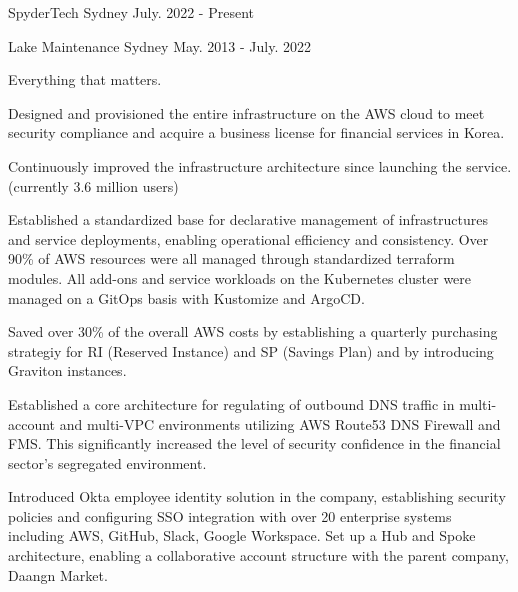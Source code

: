 
\begin{cventries}
  {SpyderTech} %
  {Sydney} %
  {July. 2022 - Present} %
  { }

  {Lake Maintenance} %
  {Sydney} %
  {May. 2013 - July. 2022} %
  { \begin{cvitems} %
  \item {Everything that matters.} \item {Designed and provisioned the entire infrastructure on the AWS cloud to meet security compliance and acquire a business license for financial services in Korea.} \item {Continuously improved the infrastructure architecture since launching the service. (currently 3.6 million users)} \item {Established a standardized base for declarative management of infrastructures and service deployments, enabling operational efficiency and consistency. Over 90\% of AWS resources were all managed through standardized terraform modules. All add-ons and service workloads on the Kubernetes cluster were managed on a GitOps basis with Kustomize and ArgoCD.} \item {Saved over 30\% of the overall AWS costs by establishing a quarterly purchasing strategiy for RI (Reserved Instance) and SP (Savings Plan) and by introducing Graviton instances.} \item {Established a core architecture for regulating of outbound DNS traffic in multi-account and multi-VPC environments utilizing AWS Route53 DNS Firewall and FMS. This significantly increased the level of security confidence in the financial sector's segregated environment.} \item {Introduced Okta employee identity solution in the company, establishing security policies and configuring SSO integration with over 20 enterprise systems including AWS, GitHub, Slack, Google Workspace. Set up a Hub and Spoke architecture, enabling a collaborative account structure with the parent company, Daangn Market.}\end{cvitems} }

\end{cventries}
